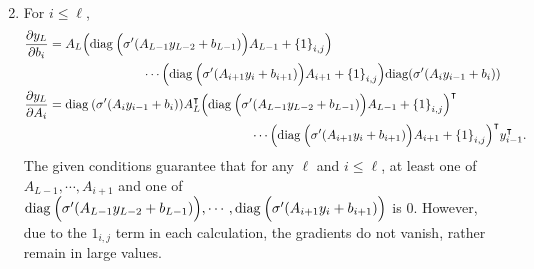 \documentclass[10pt]{article}
\begin{document}
\begin{enumerate}[(1), leftmargin=*]
\begin{align*}
    \end{align*}
    \item For $i \leq \ell$, 
    \begin{align*}
        \frac{\partial y_L}{\partial b_i} &= A_L\qty(\text{diag}\:\Big(\sigma'\qty(A_{L-1} y_{L-2} + b_{L-1})\Big) A_{L-1} + \qty{1}_{i, j}) \\
        &\;\;\;\;\;\;\;\;\;\;\;\;\;\;\;\;\;\;\;\;\;\;\;\;\;\;\;\cdots\qty(\text{diag}\:\Big(\sigma'\qty(A_{i+1} y_{i} + b_{i+1})\Big) A_{i+1} + \qty{1}_{i, j})\text{diag}\qty(\sigma'\qty(A_i y_{i-1} + b_i)) \\
        \frac{\partial y_L}{\partial A_i} &= \text{diag}\:\qty(\sigma'\qty(A_i y_{i-1} + b_i))A_L^\intercal\qty(\text{diag}\:\Big(\sigma'\qty(A_{L-1} y_{L-2} + b_{L-1})\Big) A_{L-1} + \qty{1}_{i, j})^\intercal \\
        &\;\;\;\;\;\;\;\;\;\;\;\;\;\;\;\;\;\;\;\;\;\;\;\;\;\;\;\;\;\;\;\;\;\;\;\;\;\;\;\;\;\;\;\;\;\;\;\;\;\;\;\;\;\;\;\;\;\;\cdots\qty(\text{diag}\:\Big(\sigma'\qty(A_{i+1} y_{i} + b_{i+1})\Big) A_{i+1} + \qty{1}_{i, j})^\intercal y_{i-1}^\intercal. \\
    \end{align*}
    The given conditions guarantee that for any $\ell$ and $i \leq \ell$, at least one of $A_{L-1}, \cdots, A_{i+1}$ and one of $\text{diag}\:\Big(\sigma'\qty(A_{L-1} y_{L-2} + b_{L-1})\Big), \cdots, \text{diag}\:\Big(\sigma'\qty(A_{i+1} y_{i} + b_{i+1})\Big)$ is $0$.
    However, due to the $\qty{1}_{i, j}$ term in each calculation, the gradients do not vanish, rather remain in large values.
\end{enumerate}
\end{document}
